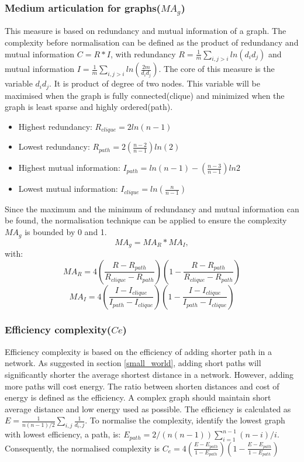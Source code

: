 \documentclass[12pt]{article}
\begin{document}
\subsubsection{Medium articulation for graphs($MA_g$)}
\label{magdefinition}
This measure is based on redundancy and mutual information of a graph.\cite{wilhelm2007information} The complexity before normalisation can be defined as the product of redundancy and mutual information $C=R*I$, with redundancy $R=\frac{1}{m}\sum_{i,j>i}ln(d_id_j)$ and mutual information $I=\frac{1}{m}\sum_{i,j>i}ln(\frac{2m}{d_id_j})$. The core of this measure is the variable $d_id_j$. It is product of degree of two nodes. This variable will be maximised when the graph is fully connected(clique) and minimized when the graph is least sparse and highly ordered(path).
\begin{itemize}
    \item Highest redundancy: $R_{clique} = 2ln(n-1)$
    \item Lowest redundancy: $R_{path} = 2(\frac{n-2}{n-1})ln(2)$
    \item Highest mutual information: $I_{path} = ln(n-1)-(\frac{n-3}{n-1})ln2$
    \item Lowest mutual information: $I_{clique}=ln(\frac{n}{n-1})$
\end{itemize}
\par
Since the maximum and the minimum of redundancy and mutual information can be found, the normalisation technique can be applied to ensure the complexity $MA_g$ is bounded by 0 and 1.
\begin{equation}
    MA_g=MA_R*MA_I,
\end{equation}
with:
\begin{equation}
    MA_R=4(\frac{R-R_{path}}{R_{clique}-R_{path}})(1-\frac{R-R_{path}}{R_{clique}-R_{path}})
\end{equation}
\begin{equation}
    MA_I=4(\frac{I-I_{clique}}{I_{path}-I_{clique}})(1-\frac{I-I_{clique}}{I_{path}-I_{clique}})
\end{equation}
\subsubsection{Efficiency complexity($Ce$)}
Efficiency complexity is based on the efficiency of adding shorter path in a network.\cite{latora2003economic} As suggested in section \ref{small_world}, adding short paths will significantly shorter the average shortest distance in a network. However, adding more paths will cost energy. The ratio between shorten distances and cost of energy is defined as the efficiency. A complex graph should maintain short average distance and low energy used as possible. The efficiency is calculated as $E=\frac{1}{n(n-1)/2}\sum_{i,j}\frac{1}{d_i,j}$. To normalise the complexity, identify the lowest graph with lowest efficiency, a path, is: $E_{path} = 2/(n(n-1))\sum_{i=1}^{n-1}(n-i)/i$. Consequently, the normalised complexity is $C_e=4(\frac{E-E_{path}}{1-E_{path}})(1-\frac{E-E_{path}}{1-E_{path}})$
\end{document}
